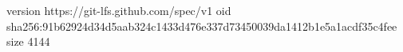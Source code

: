 version https://git-lfs.github.com/spec/v1
oid sha256:91b62924d34d5aab324c1433d476e337d73450039da1412b1e5a1acdf35c4fee
size 4144
